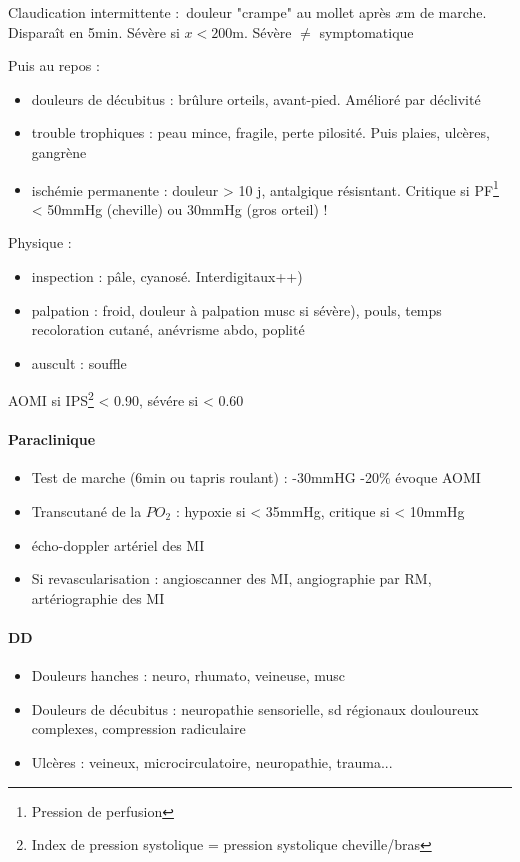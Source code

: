 Claudication intermittente : douleur "crampe" au mollet après $x$m de marche.
Disparaît en 5min. Sévère si $x < 200$m. \danger{} Sévère $\neq$ symptomatique

Puis au repos : 
\begin{itemize}
  \item douleurs de décubitus : brûlure orteils, avant-pied. Amélioré par
    déclivité
  \item trouble trophiques : peau mince, fragile, perte pilosité. Puis plaies,
    ulcères, gangrène
  \item ischémie permanente : douleur > 10 j, antalgique résisntant. Critique si
    PF\footnote{Pression de perfusion} < 50mmHg (cheville) ou 30mmHg (gros
    orteil) !
\end{itemize}
Physique : 
\begin{itemize}
  \item inspection : pâle, cyanosé. Interdigitaux++)
  \item palpation : froid, douleur à palpation musc si sévère), pouls, temps recoloration cutané, anévrisme
abdo, poplité
  \item auscult : souffle
\end{itemize}
AOMI si IPS\footnote{Index de pression systolique = pression systolique
cheville/bras} < 0.90, sévére si < 0.60

\paragraph{Paraclinique}
\begin{itemize}
  \item Test de marche (6min ou tapris roulant) : -30mmHG \lor{} -20\% évoque AOMI
  \item Transcutané de la $PO_2$ : hypoxie si < 35mmHg, critique si < 10mmHg
  \item écho-doppler artériel des MI
  \item Si revascularisation : angioscanner des MI, angiographie par RM,
    artériographie des MI
\end{itemize}

\paragraph{DD} 
\begin{itemize}
  \item Douleurs hanches : neuro, rhumato, veineuse, musc
  \item Douleurs de décubitus : neuropathie sensorielle, sd régionaux douloureux
    complexes, compression radiculaire
  \item Ulcères : veineux, microcirculatoire, neuropathie, trauma...
\end{itemize}

